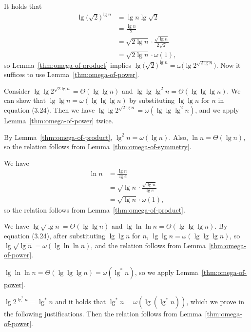 \begin{description}[style=nextline]
    It holds that
    \begin{align*}
        \lg\bigl(\sqrt{2}\bigr)^{\lg n} &= \lg n\lg\sqrt{2} \\
        &= \frac{\lg n}{2} \\
        &= \sqrt{2\lg n}\cdot\frac{\sqrt{\lg n}}{2\sqrt{2}} \\
        &= \sqrt{2\lg n}\cdot\omega(1),
    \end{align*}
    so Lemma~\ref{thm:omega-of-product} implies $\lg\bigl(\sqrt{2}\bigr)^{\lg n}=\omega\bigl(\lg2^{\sqrt{2\lg n}}\bigr)$.
    Now it suffices to use Lemma~\ref{thm:omega-of-power}.
    \item[$2^{\sqrt{2\lg n}}=\omega(\lg^2n)$]
    Consider $\lg\lg2^{\sqrt{2\lg n}}=\Theta(\lg\lg n)$ and $\lg\lg\lg^2n=\Theta(\lg\lg\lg n)$.
    We can show that $\lg\lg n=\omega(\lg\lg\lg n)$ by substituting $\lg\lg n$ for $n$ in equation (3.24).
    Then we have $\lg\lg2^{\sqrt{2\lg n}}=\omega(\lg\lg\lg^2n)$, and we apply Lemma~\ref{thm:omega-of-power} twice.
    \item[$\lg^2n=\omega(\ln n)$]
    By Lemma~\ref{thm:omega-of-product}, $\lg^2n=\omega(\lg n)$.
    Also, $\ln n=\Theta(\lg n)$, so the relation follows from Lemma~\ref{thm:omega-of-symmetry}.
    \item[$\ln n=\omega\bigl(\sqrt{\lg n}\bigr)$]
    We have
    \begin{align*}
        \ln n &= \frac{\lg n}{\lg e} \\
        &= \sqrt{\lg n}\cdot\frac{\sqrt{\lg n}}{\lg e} \\
        &= \sqrt{\lg n}\cdot\omega(1),
    \end{align*}
    so the relation follows from Lemma~\ref{thm:omega-of-product}.
    \item[$\sqrt{\lg n}=\omega(\ln\ln n)$]
    We have $\lg\sqrt{\lg n}=\Theta(\lg\lg n)$ and $\lg\ln\ln n=\Theta(\lg\lg\lg n)$.
    By equation (3.24), after substituting $\lg\lg n$ for $n$, $\lg\lg n=\omega(\lg\lg\lg n)$, so $\lg\sqrt{\lg n}=\omega(\lg\ln\ln n)$, and the relation follows from Lemma~\ref{thm:omega-of-power}.
    \item[$\ln\ln n=\omega\bigl(2^{\lg^*n}\bigr)$]
    $\lg\ln\ln n=\Theta(\lg\lg\lg n)=\omega(\lg^*n)$, so we apply Lemma~\ref{thm:omega-of-power}.
    \item[$2^{\lg^*n}=\omega(\lg^*n)$]
    $\lg2^{\lg^*n}=\lg^*n$ and it holds that $\lg^*n=\omega(\lg(\lg^*n))$, which we prove in the following justifications.
    Then the relation follows from Lemma~\ref{thm:omega-of-power}.

\end{description}
